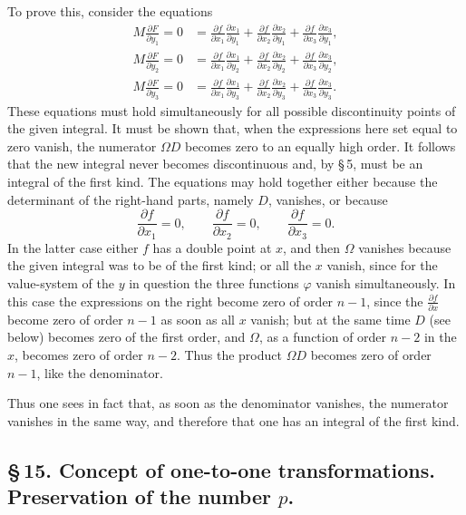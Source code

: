 \documentclass[10pt]{article}
\begin{document}
To prove this, consider the equations
\[
\begin{aligned}
M\frac{\partial F}{\partial y_1}=0
&=\frac{\partial f}{\partial x_1}\frac{\partial x_1}{\partial y_1}
+\frac{\partial f}{\partial x_2}\frac{\partial x_2}{\partial y_1}
+\frac{\partial f}{\partial x_3}\frac{\partial x_3}{\partial y_1},\\
M\frac{\partial F}{\partial y_2}=0
&=\frac{\partial f}{\partial x_1}\frac{\partial x_1}{\partial y_2}
+\frac{\partial f}{\partial x_2}\frac{\partial x_2}{\partial y_2}
+\frac{\partial f}{\partial x_3}\frac{\partial x_3}{\partial y_2},\\
M\frac{\partial F}{\partial y_3}=0
&=\frac{\partial f}{\partial x_1}\frac{\partial x_1}{\partial y_3}
+\frac{\partial f}{\partial x_2}\frac{\partial x_2}{\partial y_3}
+\frac{\partial f}{\partial x_3}\frac{\partial x_3}{\partial y_3}.
\end{aligned}
\]
These equations must hold simultaneously for all possible discontinuity points of the given integral. It must be shown that, when the expressions here set equal to zero vanish, the numerator \(\Omega D\) becomes zero to an equally high order. It follows that the new integral never becomes discontinuous and, by \S\,5, must be an integral of the first kind. The equations may hold together either because the determinant of the right-hand parts, namely \(D\), vanishes, or because
\[
\frac{\partial f}{\partial x_1}=0,\qquad
\frac{\partial f}{\partial x_2}=0,\qquad
\frac{\partial f}{\partial x_3}=0.
\]
In the latter case either \(f\) has a double point at \(x\), and then \(\Omega\) vanishes because the given integral was to be of the first kind; or all the \(x\) vanish, since for the value-system of the \(y\) in question the three functions \(\varphi\) vanish simultaneously. In this case the expressions on the right become zero of order \(n-1\), since the \(\frac{\partial f}{\partial x}\) become zero of order \(n-1\) as soon as all \(x\) vanish; but at the same time \(D\) (see below) becomes zero of the first order, and \(\Omega\), as a function of order \(n-2\) in the \(x\), becomes zero of order \(n-2\). Thus the product \(\Omega D\) becomes zero of order \(n-1\), like the denominator.

Thus one sees in fact that, as soon as the denominator vanishes, the numerator vanishes in the same way, and therefore that one has an integral of the first kind.

\subsection*{\S\,15. Concept of one-to-one transformations. Preservation of the number \(p\).}
\end{document}
